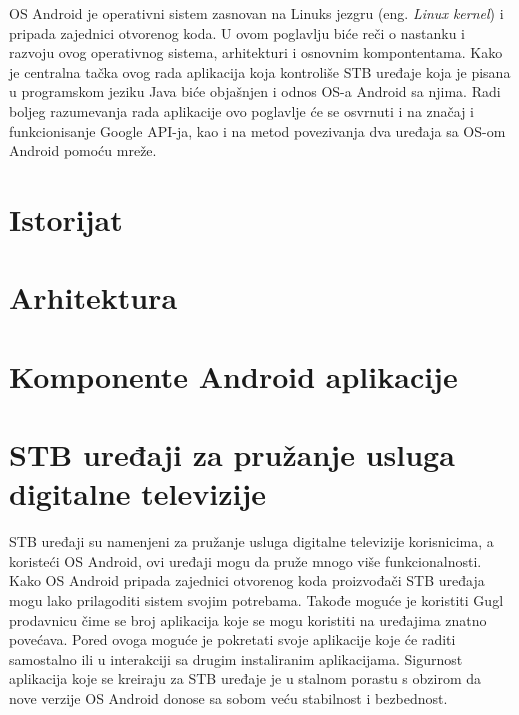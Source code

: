 \documentclass[../TamaraIvanovicMasterRad.tex]{subfiles}
\begin{document}
OS Android je operativni sistem zasnovan na Linuks jezgru (eng. \textit{Linux kernel}) i pripada zajednici otvorenog koda. U ovom poglavlju biće reči o nastanku i razvoju ovog operativnog sistema, arhitekturi i osnovnim kompontentama. Kako je centralna tačka ovog rada aplikacija koja kontroliše STB uređaje koja je pisana u programskom jeziku Java biće objašnjen i odnos OS-a Android sa njima. Radi boljeg razumevanja rada aplikacije ovo poglavlje će se osvrnuti i na značaj i funkcionisanje Google API-ja, kao i na metod povezivanja dva uređaja sa OS-om Android pomoću mreže. 
\section{Istorijat}



\section{Arhitektura}



\section{Komponente Android aplikacije}


\section{STB uređaji za pružanje usluga digitalne televizije}
STB uređaji su namenjeni za pružanje usluga digitalne televizije korisnicima, a koristeći OS Android, ovi uređaji mogu da pruže mnogo više funkcionalnosti. Kako OS Android pripada zajednici otvorenog koda proizvođači STB uređaja mogu lako prilagoditi sistem svojim potrebama. Takođe moguće je koristiti Gugl prodavnicu čime se broj aplikacija koje se mogu koristiti na uređajima znatno povećava. Pored ovoga moguće je pokretati svoje aplikacije koje će raditi samostalno ili u interakciji sa drugim instaliranim aplikacijama. Sigurnost aplikacija koje se kreiraju za STB uređaje je u stalnom porastu s obzirom da nove verzije OS Android donose sa sobom veću stabilnost i bezbednost. 
\end{document}
